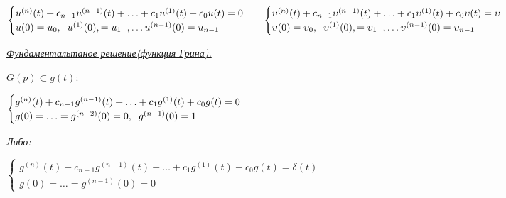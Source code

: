 \documentclass{article}
\begin{document}
\begin{large}
\begin{normalsize}
$\\
\begin{matrix}
	\begin{cases}
		u^{(n)}(t) + c_{n-1}u^{(n-1)}(t)+\ldots + c_1u^{(1)}(t) +c_0u(t) = 0 \\
		u(0) = u_0, \text{\hspace{0.2cm}} u^{(1)}(0), = u_1 \text{\hspace{0.2cm}}, \ldots 			u^{(n-1)}(0) = u_{n-1}
	\end{cases}
	&
	\begin{cases}
		\upsilon^{(n)}(t) + c_{n-1}\upsilon^{(n-1)}(t)+\ldots + c_1\upsilon^{(1)}(t) +c_0\upsilon (t) = \upsilon \\
		\upsilon(0) = \upsilon_0, \text{\hspace{0.2cm}} \upsilon^{(1)}(0), = \upsilon_1 \text{\hspace{0.2cm}}, \ldots 			\upsilon^{(n-1)}(0) = \upsilon_{n-1}
	\end{cases}
\end{matrix}
$

\end{normalsize}

\newpage
\begin{LARGE}
\textit{\underline{Фундаментальтаное решение(функция Грина).}}
\end{LARGE}

\vspace{0.5cm}
$
G(p) \subset g(t) :
$

\vspace{0.5cm}
$
\begin{cases}
	g^{(n)}(t) + c_{n-1}g^{(n-1)}(t)+\ldots + c_1g^{(1)}(t) +c_0g(t) = 0 \\
	g(0) =  \ldots =g^{(n-2)}(0) = 0,\text{\hspace{0.2cm}} g^{(n-1)}(0) = 1
\end{cases}
$

\vspace{0.5cm}
\begin{Large}
\textit{Либо:}
\end{Large}

\vspace{0.5cm}
$
\begin{cases}
	g^{(n)}(t) + c_{n-1}g^{(n-1)}(t)+\ldots + c_1g^{(1)}(t) +c_0g(t) = \delta(t)\\
	g(0) =  \ldots =g^{(n-1)}(0) = 0
\end{cases}
$


\end{large}
\end{document}
